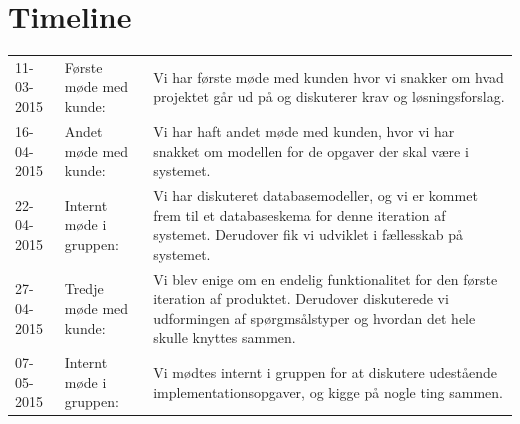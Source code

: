 \documentclass[11pt, a4paper]{article}
\begin{document}
\section{Timeline}
\begin{tabular}{l l p{8cm}}
11-03-2015 & Første møde med kunde: & Vi har første møde med kunden hvor vi snakker om hvad projektet går ud på og diskuterer krav og løsningsforslag. \\
16-04-2015 & Andet møde med kunde: & Vi har haft andet møde med kunden, hvor vi har snakket om modellen for de opgaver der skal være i systemet. \\
22-04-2015 & Internt møde i gruppen: & Vi har diskuteret databasemodeller, og vi er kommet frem til et databaseskema for denne iteration af systemet. Derudover fik vi udviklet i fællesskab på systemet. \\
27-04-2015 & Tredje møde med kunde: & Vi blev enige om en endelig funktionalitet for den første iteration af produktet. Derudover diskuterede vi udformingen af spørgmsålstyper og hvordan det hele skulle knyttes sammen. \\
07-05-2015 & Internt møde i gruppen: & Vi mødtes internt i gruppen for at diskutere udestående implementationsopgaver, og kigge på nogle ting sammen. \\
\end{tabular}


{}
\end{document}
